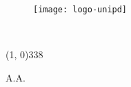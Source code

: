 \frontmatter
\begin{titlepage}

\begin{center}

\begin{LARGE}
\textbf{\myUni}\\
\end{LARGE}

\vspace{10pt}

\begin{Large}
\textsc{\myDepartment}\\
\end{Large}

\vspace{10pt}

\begin{large}
\textsc{\myFaculty}\\
\end{large}

\vspace{30pt}
\begin{figure}[htbp]
\begin{center}
\texttt{[image: logo-unipd]}
\end{center}
\end{figure}
\vspace{30pt}

\begin{LARGE}
\begin{center}
\textbf{\myTitle}\\
\end{center}
\end{LARGE}

\vspace{1pt}

\begin{normalsize}
\textsc{\myName}
\end{normalsize}

\vspace{1pt}

\begin{normalsize}
\textsc{\myVersion}
\end{normalsize}


\vfill

\line(1, 0){338} \\
\begin{normalsize}
\textsc{A.A. \myAA}
\end{normalsize}

\end{center}
\end{titlepage}
